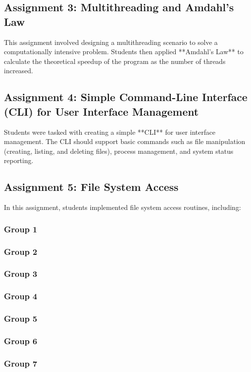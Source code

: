 \documentclass[12pt]{article}
\begin{document}
\subsection{Assignment 3: Multithreading and Amdahl's Law}
This assignment involved designing a multithreading scenario to solve a computationally intensive problem. Students then applied **Amdahl's Law** to calculate the theoretical speedup of the program as the number of threads increased.

\subsection{Assignment 4: Simple Command-Line Interface (CLI) for User Interface Management}
Students were tasked with creating a simple **CLI** for user interface management. The CLI should support basic commands such as file manipulation (creating, listing, and deleting files), process management, and system status reporting.

\subsection{Assignment 5: File System Access}
In this assignment, students implemented file system access routines, including:

\subsubsection{Group 1}
\subsubsection{Group 2}
\subsubsection{Group 3}
\subsubsection{Group 4}
\subsubsection{Group 5}
\subsubsection{Group 6}
\subsubsection{Group 7}
\end{document}
